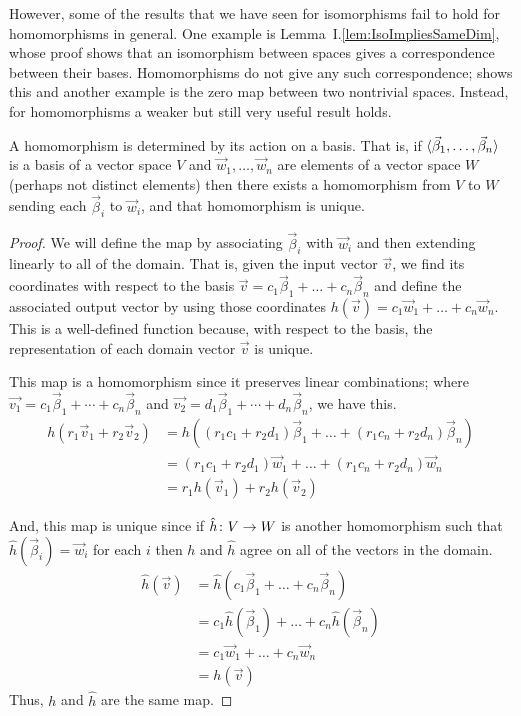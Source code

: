 However,
some of the results that we have seen for isomorphisms fail to hold for
homomorphisms in general.
One example is Lemma~I.\ref{lem:IsoImpliesSameDim}, whose proof shows that
an isomorphism between spaces gives a correspondence between their
bases.
Homomorphisms do not give any such correspondence;
 shows this and another example is
the zero map between two nontrivial spaces. 
Instead, for homomorphisms a weaker but still very useful result holds.

\begin{theorem}
\label{th:HomoDetActOnBasis}
A homomorphism is determined by its action on a basis.
That is, if
\( \langle\vec{\beta}_1,\dots,\vec{\beta}_n\rangle \)
is a basis of a vector space \( V \) and
\( \vec{w}_1,\dots,\vec{w}_n \) are elements of
a vector space \( W \)  (perhaps not distinct elements) then
there exists a homomorphism from \( V \) to \( W \) sending each
\( \vec{\beta}_i \) to \( \vec{w}_i \), and that homomorphism is unique.
\end{theorem}

\begin{proof}
We will define the map by 
associating $\vec{\beta}_i$ with $\vec{w}_i$
and then extending linearly to all of the domain.
That is, given the input vector $\vec{v}$, we find its coordinates with
respect to the basis
\( \vec{v}=c_1\vec{\beta}_1+\dots+c_n\vec{\beta}_n \) and define
the associated output vector by using those coordinates
$h(\vec{v})=c_1\vec{w}_1+\dots+c_n\vec{w}_n$.
This is a well-defined function because, with respect to the basis,
the representation of each domain vector \( \vec{v} \) is unique.

This map is a homomorphism since it preserves linear combinations;
where \( \vec{v_1}=c_1\vec{\beta}_1+\cdots+c_n\vec{\beta}_n \) and
\( \vec{v_2}=d_1\vec{\beta}_1+\cdots+d_n\vec{\beta}_n \),
we have this.
\begin{align*}
  h(r_1\vec{v}_1+r_2\vec{v}_2)
  &=h((r_1c_1+r_2d_1)\vec{\beta}_1+\dots+(r_1c_n+r_2d_n)\vec{\beta}_n)  \\
  &=(r_1c_1+r_2d_1)\vec{w}_1+\dots+(r_1c_n+r_2d_n)\vec{w}_n   \\
  &=r_1h(\vec{v}_1)+r_2h(\vec{v}_2)
\end{align*}

And, this map is unique since if \( \mbox{$\hat{h}\colon V\to W$} \) 
is another homomorphism such that \( \hat{h}(\vec{\beta}_i)=\vec{w}_i \) 
for each \( i \)
then \( h \) and \( \hat{h} \) agree on all of the vectors in the domain. 
\begin{align*}
  \hat{h}(\vec{v})
  &=\hat{h}(c_1\vec{\beta}_1+\dots+c_n\vec{\beta}_n)  \\
  &=c_1\hat{h}(\vec{\beta}_1)+\dots+c_n\hat{h}(\vec{\beta}_n)  \\
  &=c_1\vec{w}_1+\dots+c_n\vec{w}_n  \\
  &=h(\vec{v})
\end{align*}
Thus, $h$ and $\hat{h}$ are the same map.
\end{proof}

